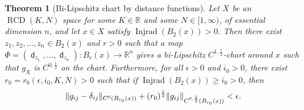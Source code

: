 \documentclass[11pt,reqno]{amsart}
\newtheorem{theorem}{Theorem}[section]
\theoremstyle{definition}
\numberwithin{equation}{section}
\newcommand{\dR}{\mathbb{R}}
\DeclareMathOperator{\dist}{\mathsf{d}}
\DeclareMathOperator{\Injrad}{Injrad}
\DeclareMathOperator{\RCD}{RCD}
\begin{document}
\begin{theorem}[Bi-Lipschitz chart by distance functions]\label{cor:distance coordinate}
Let $X$ be an $\RCD(K, N)$ space for some $K \in \mathbb{R}$ and some $N \in [1, \infty)$, of essential dimension $n$, and let $x \in X$ satisfy
$
\Injrad(B_2 (x))>0.
$
Then there exist $z_1, z_2, \ldots, z_n \in B_2 (x)$ and $r>0$
such that 
a map $\Phi=(\dist_{z_1}, \ldots, \dist_{z_n}): B_r(x) \to \dR^n$ gives a bi-Lipschitz $C^{1, \frac{1}{2}}$-chart around $x$ such that $g_X$ is $C^{0,\frac{1}{2}}$ on the chart. 
 Furthermore, for all $\epsilon > 0$ and $i_0 > 0$, there exist $r_0 = r_0 (\epsilon, i_0, K, N) > 0$ such that if $\Injrad(B_2(x)) \geq i_0 > 0$, then  
\begin{align}
\|g_{ij} - \delta_{ij}\|_{C^0 (B_{r_0}(x))} + (r_0)^{\frac{1}{2}} \|g_{ij}\|_{C^{0,\frac{1}{2}}(B_{r_0}(x))} < \epsilon. \label{e:quantitative-C^{1/2}}
\end{align}

\end{theorem}
\end{document}
